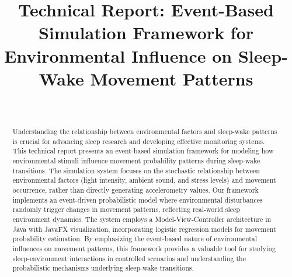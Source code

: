 \documentclass[conference]{IEEEtran}
\begin{document}
\title{Technical Report: Event-Based Simulation Framework for Environmental Influence on Sleep-Wake Movement Patterns}

\author{
	\\
	\and
}

\maketitle

\begin{abstract}
	Understanding the relationship between environmental factors and sleep-wake patterns is crucial for advancing sleep research and developing effective monitoring systems. This technical report presents an event-based simulation framework for modeling how environmental stimuli influence movement probability patterns during sleep-wake transitions. The simulation system focuses on the stochastic relationship between environmental factors (light intensity, ambient sound, and stress levels) and movement occurrence, rather than directly generating accelerometry values. Our framework implements an event-driven probabilistic model where environmental disturbances randomly trigger changes in movement patterns, reflecting real-world sleep environment dynamics. The system employs a Model-View-Controller architecture in Java with JavaFX visualization, incorporating logistic regression models for movement probability estimation. By emphasizing the event-based nature of environmental influences on movement patterns, this framework provides a valuable tool for studying sleep-environment interactions in controlled scenarios and understanding the probabilistic mechanisms underlying sleep-wake transitions.
\end{abstract}
\end{document}
